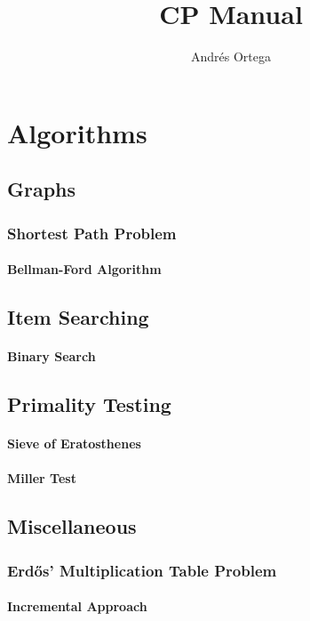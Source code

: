 \documentclass[12pt]{book}
\newcommand{\<}{\langle}
\renewcommand{\>}{\rangle}
\renewcommand{\(}{\left(}
\renewcommand{\)}{\right)}
\begin{document}
\title{CP Manual}
\author{Andrés Ortega}
\date{}

\maketitle

\tableofcontents

\chapter{Algorithms}
    \section{Graphs}
        \subsection{Shortest Path Problem}
            \subsubsection{Bellman-Ford Algorithm}
                
    \section{Item Searching}
        \subsubsection{Binary Search}
            

    \section{Primality Testing}
        \subsubsection{Sieve of Eratosthenes}
            

        \subsubsection{Miller Test}
            

    \section{Miscellaneous}
        \subsection{Erdős' Multiplication Table Problem}
            \subsubsection{Incremental Approach}
                

\printbibliography
\end{document}
